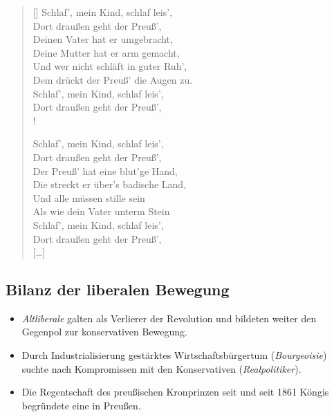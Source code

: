 \begin{verse}[\versewidth]
Schlaf’, mein Kind, schlaf leis’, \\
Dort draußen geht der Preuß’, \\
Deinen Vater hat er umgebracht, \\
Deine Mutter hat er arm gemacht, \\
Und wer nicht schläft in guter Ruh’, \\
Dem drückt der Preuß’ die Augen zu. \\
Schlaf’, mein Kind, schlaf leis’, \\
Dort draußen geht der Preuß’, \\!

Schlaf’, mein Kind, schlaf leis’, \\
Dort draußen geht der Preuß’, \\
Der Preuß' hat eine blut’ge Hand, \\
Die streckt er über’s badische Land, \\
Und alle müssen stille sein \\
Als wie dein Vater unterm Stein \\
Schlaf’, mein Kind, schlaf leis’, \\
Dort draußen geht der Preuß’,  \\
\mbox{[\dots]} \\
\end{verse}


\subsection{Bilanz der liberalen Bewegung}

\begin{itemize}
\item \emph{Altliberale} galten als Verlierer der Revolution und
bildeten weiter den Gegenpol zur konservativen Bewegung.

\item Durch Industrialisierung gestärktes Wirtschaftsbürgertum
(\emph{Bourgeoisie}) suchte nach Kompromissen mit
den Konservativen (\emph{Realpolitiker}).

\item Die Regentschaft des preußischen Kronprinzen seit  und
seit 1861 Köngis  begründete eine  in Preußen.
\end{itemize}

